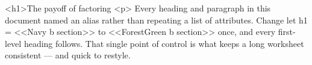 \documentclass[
margins=20,
font=Latin Modern Roman,
size=12,
lang=en
]{scholatex}
\begin{document}
	<h1>The payoff of factoring
	<p>{
		Every heading and paragraph in this document named an alias rather than
		repeating a list of attributes. Change let h1 = <<Navy b section>>
		to <<ForestGreen b section>> once, and every first-level heading
		follows. That single point of control is what keeps a long worksheet
		consistent — and quick to restyle.
	}
	
\end{document}
